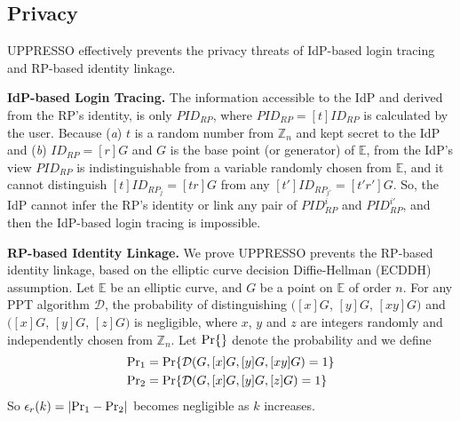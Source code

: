 


\subsection{Privacy}
\label{sec-:analysis}
UPPRESSO effectively prevents the privacy threats of IdP-based login tracing and RP-based identity linkage.

\vspace{1mm}
\noindent\textbf{IdP-based Login Tracing.}
The information accessible to the IdP and derived from the RP's identity,
    is only $PID_{RP}$, where $PID_{RP} = [t]ID_{RP}$ is calculated by the user.
Because  (\emph{a}) $t$ is a random number from $\mathbb{Z}_n$ and kept secret to the IdP
 and (\emph{b}) $ID_{RP} = [r]G$ and $G$ is the base point (or generator) of $\mathbb{E}$,
from the IdP's view
$PID_{RP}$
is indistinguishable from a variable randomly chosen from $\mathbb{E}$,
    and it cannot distinguish $[t]ID_{RP_j} = [tr]G$ from any $[t']ID_{RP_{j'}} = [t'r']G$.
So, the IdP cannot infer the RP's identity or link any pair of $PID_{RP}^i$ and $PID_{RP}^{i'}$,
    and then the IdP-based login tracing is impossible.

\vspace{1mm}
\noindent\textbf{RP-based Identity Linkage.}
We prove UPPRESSO prevents the RP-based identity linkage,
 based on the elliptic curve decision Diffie-Hellman (ECDDH) assumption. %
%
Let $\mathbb{E}$ be an elliptic curve,
    and $G$ be a point on $\mathbb{E}$ of order $n$.
For any PPT algorithm $\mathcal{D}$, the probability of distinguishing
 $([x]G$, $[y]G$, $[xy]G)$ and $([x]G$, $[y]G$, $[z]G)$
is negligible,
 where $x$, $y$ and $z$ are integers randomly and independently chosen from $\mathbb{Z}_n$.
Let  ${\rm Pr}\{\}$ denote the probability and
 we define
\begin{align*}
&{\rm Pr}_1 =  {\rm Pr}\{\mathcal{D}(G, [x]G, [y]G, [xy]G)=1\} \\
&{\rm Pr}_2 =  {\rm Pr}\{\mathcal{D}(G, [x]G, [y]G, [z]G)=1\}
\end{align*}
So $\epsilon_{r}(k) = |{\rm Pr}_1 - {\rm Pr}_2|$ becomes negligible as $k$ increases.

